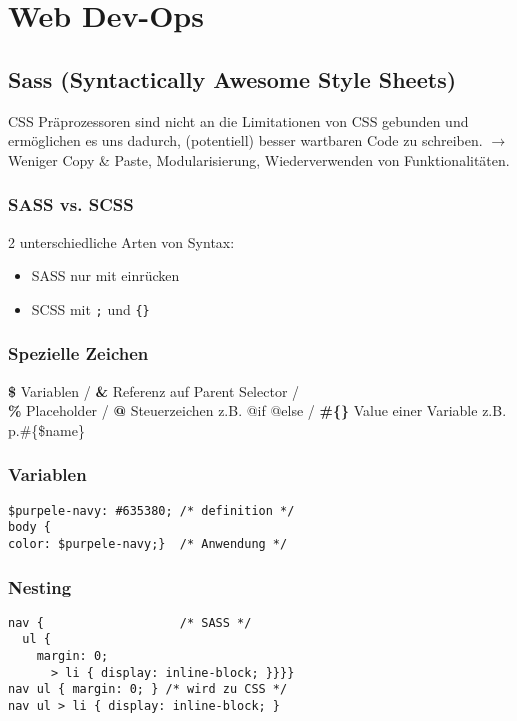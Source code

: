
\section{Web Dev-Ops}


\subsection{Sass (Syntactically Awesome Style Sheets)}
CSS Präprozessoren sind nicht an die Limitationen von CSS gebunden und ermöglichen es uns dadurch, (potentiell) besser wartbaren Code zu schreiben. $\rightarrow$  Weniger Copy \& Paste, Modularisierung, Wiederverwenden von Funktionalitäten.

\subsubsection{SASS vs. SCSS}
2 unterschiedliche Arten von Syntax:
\begin{itemize}
    \item SASS nur mit einrücken
    \item SCSS mit \texttt{;} und \texttt{\{\}}
\end{itemize}

\subsubsection{Spezielle Zeichen}
\textbf{\$} Variablen /
\textbf{\&} Referenz auf Parent Selector / \\
\textbf{\%} Placeholder /
\textbf{@} Steuerzeichen z.B. @if @else / 
\textbf{\#\{\}} Value einer Variable z.B. p.\#\{\$name\} { }

\subsubsection{Variablen}
\begin{lstlisting}
$purpele-navy: #635380; /* definition */
body {
color: $purpele-navy;}  /* Anwendung */
\end{lstlisting}

\subsubsection{Nesting}
\begin{lstlisting}
nav {                   /* SASS */
  ul {
    margin: 0;
      > li { display: inline-block; }}}}
nav ul { margin: 0; } /* wird zu CSS */
nav ul > li { display: inline-block; }
\end{lstlisting}

